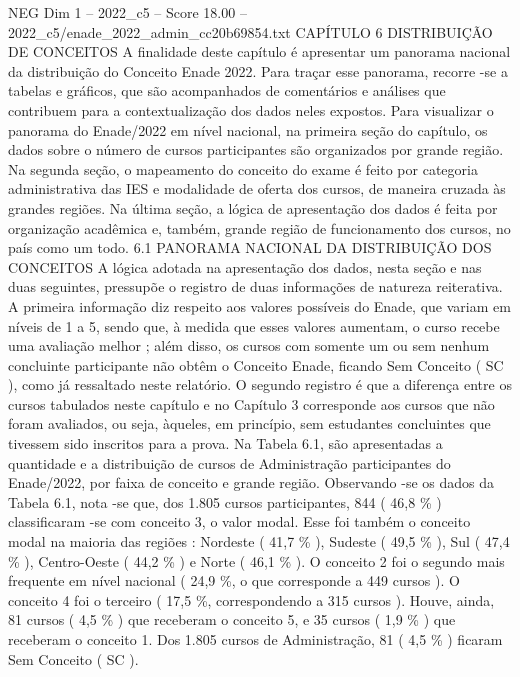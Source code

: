 \begin{textsample}{NEG Dim 1 – 2022\_c5 – Score 18.00 – 2022\_c5/enade\_2022\_admin\_cc20b69854.txt}  \label{ex:f1_neg_419}
CAPÍTULO 6 DISTRIBUIÇÃO DE CONCEITOS A finalidade deste capítulo é apresentar um panorama nacional da distribuição do Conceito Enade 2022.
Para traçar esse panorama, recorre -se a tabelas e gráficos, que são acompanhados de comentários e análises que contribuem para a contextualização dos dados neles expostos.
Para visualizar o panorama do Enade/2022 em nível nacional, na primeira seção do capítulo, os dados sobre o número de cursos participantes são organizados por grande região.
Na segunda seção, o mapeamento do conceito do exame é feito por categoria administrativa das IES e modalidade de oferta dos cursos, de maneira cruzada às grandes regiões.
Na última seção, a lógica de apresentação dos dados é feita por organização acadêmica e, também, grande região de funcionamento dos cursos, no país como um todo. 6.1 PANORAMA NACIONAL DA DISTRIBUIÇÃO DOS CONCEITOS A lógica adotada na apresentação dos dados, nesta seção e nas duas seguintes, pressupõe o registro de duas informações de natureza reiterativa.
A primeira informação diz respeito aos valores possíveis do Enade, que variam em níveis de 1 a 5, sendo que, à medida que esses valores aumentam, o curso recebe uma avaliação melhor ; além disso, os cursos com somente um ou sem nenhum concluinte participante não obtêm o Conceito Enade, ficando Sem Conceito ( SC ), como já ressaltado neste relatório.
O segundo registro é que a diferença entre os cursos tabulados neste capítulo e no Capítulo 3 corresponde aos cursos que não foram avaliados, ou seja, àqueles, em princípio, sem estudantes concluintes que tivessem sido inscritos para a prova.
Na Tabela 6.1, são apresentadas a quantidade e a distribuição de cursos de Administração participantes do Enade/2022, por faixa de conceito e grande região.
Observando -se os dados da Tabela 6.1, nota -se que, dos 1.805 cursos participantes, 844 ( 46,8 \% ) classificaram -se com conceito 3, o valor modal.
Esse foi também o conceito modal na maioria das regiões : Nordeste ( 41,7 \% ), Sudeste ( 49,5 \% ), Sul ( 47,4 \% ), Centro-Oeste ( 44,2 \% ) e Norte ( 46,1 \% ).
O conceito 2 foi o segundo mais frequente em nível nacional ( 24,9 \%, o que corresponde a 449 cursos ).
O conceito 4 foi o terceiro ( 17,5 \%, correspondendo a 315 cursos ).
Houve, ainda, 81 cursos ( 4,5 \% ) que receberam o conceito 5, e 35 cursos ( 1,9 \% ) que receberam o conceito 1.
Dos 1.805 cursos de Administração, 81 ( 4,5 \% ) ficaram Sem Conceito ( SC ).

\end{textsample}
